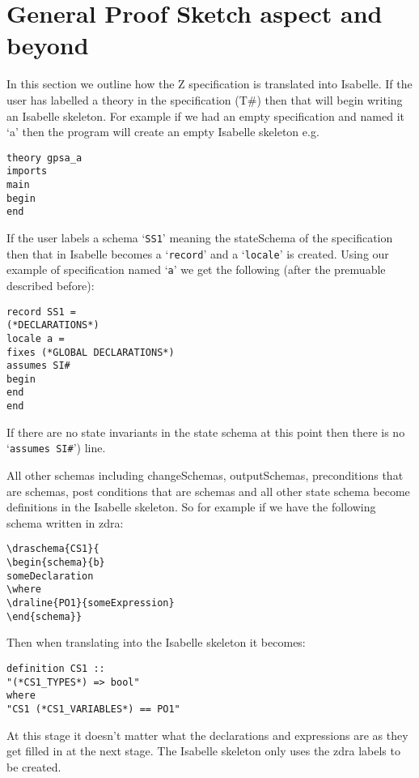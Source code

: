 \chapter{General Proof Sketch aspect and beyond}
\label{chap:gpsa2isa}

 In this section we outline how the Z specification is
translated into Isabelle. If the user has labelled a theory in the specification (T\#) then that will
begin writing an Isabelle skeleton.
For example if we had an empty specification and named it `a' then the program
will create an empty Isabelle skeleton e.g.

\begin{verbatim}
theory gpsa_a
imports
main
begin
end
\end{verbatim}

If the user labels a schema `\texttt{SS1}' meaning the stateSchema of the
specification then that in Isabelle becomes a `\texttt{record}' and a
`\texttt{locale}' is created. Using our example of specification named
`\texttt{a}' we get the following (after the premuable described before):
\begin{verbatim}
record SS1 =
(*DECLARATIONS*)
locale a =
fixes (*GLOBAL DECLARATIONS*)
assumes SI#
begin
end
end
\end{verbatim}

If there are no state invariants in the state schema at this point then there is
no `\texttt{assumes SI\#}') line.

All other schemas including changeSchemas, outputSchemas, preconditions that are
schemas, post conditions that are schemas and all other state schema become
definitions in the Isabelle skeleton. So for example if we have the following
schema written in \gls{zdra}:
\begin{verbatim}
\draschema{CS1}{
\begin{schema}{b}
someDeclaration
\where
\draline{PO1}{someExpression}
\end{schema}}
\end{verbatim}

Then when translating into the Isabelle skeleton it becomes:
\begin{verbatim}
definition CS1 ::
"(*CS1_TYPES*) => bool"
where
"CS1 (*CS1_VARIABLES*) == PO1"
\end{verbatim}

At this stage it doesn't matter what the declarations and expressions are as
they get filled in at the next stage. The Isabelle skeleton only uses the
\gls{zdra} labels to be created.

